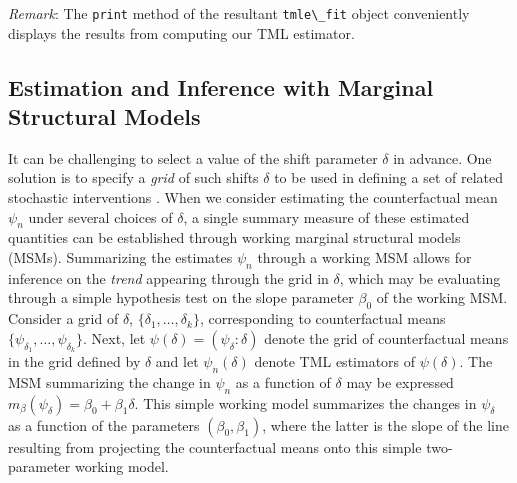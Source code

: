 \documentclass[
  12pt, krantz2,
]{krantz}
\newcommand{\passthrough}[1]{#1}
\newcommand{\1}{\mathbbm{1}}
\theoremstyle{definition}
\theoremstyle{definition}
\theoremstyle{definition}
\theoremstyle{definition}
\theoremstyle{remark}
\begin{document}
\emph{Remark}: The \passthrough{\lstinline!print!} method of the resultant \passthrough{\lstinline!tmle\_fit!} object conveniently
displays the results from computing our TML estimator.

\hypertarget{estimation-and-inference-with-marginal-structural-models}{%
\subsection{Estimation and Inference with Marginal Structural Models}\label{estimation-and-inference-with-marginal-structural-models}}

It can be challenging to select a value of the shift parameter \(\delta\) in
advance. One solution is to specify a \emph{grid} of such shifts \(\delta\) to be used
in defining a set of related stochastic interventions \citep{hejazi2020efficient}.
When we consider estimating the counterfactual mean \(\psi_n\) under several
choices of \(\delta\), a single summary measure of these estimated quantities can
be established through working marginal structural models (MSMs). Summarizing
the estimates \(\psi_n\) through a working MSM allows for inference on the \emph{trend}
appearing through the grid in \(\delta\), which may be evaluating through a simple
hypothesis test on the slope parameter \(\beta_0\) of the working MSM. Consider a
grid of \(\delta\), \(\{\delta_1, \ldots, \delta_k\}\), corresponding to
counterfactual means \(\{\psi_{\delta_1}, \ldots, \psi_{\delta_k}\}\). Next, let
\(\psi(\delta) = (\psi_{\delta}: \delta)\) denote the grid of
counterfactual means in the grid defined by \(\delta\) and let \(\psi_n(\delta)\)
denote TML estimators of \(\psi(\delta)\). The MSM summarizing the change in
\(\psi_n\) as a function of \(\delta\) may be expressed \(m_{\beta}(\psi_{\delta}) = \beta_0 + \beta_1 \delta\). This simple working model summarizes the changes in
\(\psi_{\delta}\) as a function of the parameters \((\beta_0, \beta_1)\), where the
latter is the slope of the line resulting from projecting the counterfactual
means onto this simple two-parameter working model.
\end{document}
